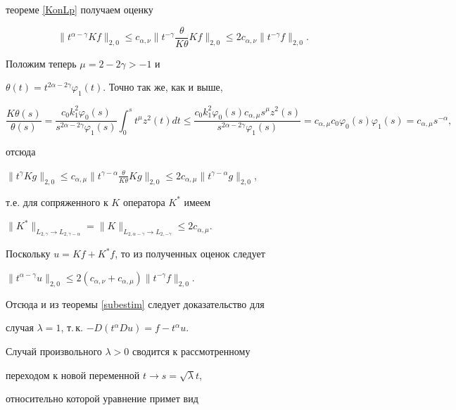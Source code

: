 \begin{pf}
теореме \ref{KonLp} получаем оценку


$$


\|t^{\alpha-\gamma}K f\|_{2,0} \le


c_{\alpha,\nu}\bigg\|t^{-\gamma}\frac{\theta}{K \theta}Kf\bigg\|_{2,0}


\le 2c_{\alpha,\nu} \|t^{-\gamma}f\|_{2,0}.


$$


Положим теперь $\mu=2-2\gamma>-1$ и


$\theta(t)=t^{2\alpha-2\gamma}\varphi_1(t)$. Точно так же, как и выше,


$$


\frac{K\theta(s)}{\theta(s)}= \frac{c_0 k_1^2


\varphi_0(s)}{s^{2\alpha-2\gamma}\varphi_1(s)}\int_0^s t^\mu


z^2(t) d t \le \frac{c_0 k_1^2 \varphi_0(s)c_{\alpha,\mu}s^\mu z^2(s)}


{s^{2\alpha-2\gamma}\varphi_1(s)}=c_{\alpha,\mu}c_0 \varphi_0(s)\varphi_1(s)


= c_{\alpha,\mu}s^{-\alpha},


$$


отсюда


$\|t^\gamma K g\|_{2,0} \le


c_{\alpha,\mu}\big\|t^{\gamma-\alpha}\frac{\theta}{K \theta}Kg\big\|_{2,0}


\le 2c_{\alpha,\mu} \|t^{\gamma-\alpha}g\|_{2,0}$,


т.е. для сопряженного к $K$ оператора $K^*$ имеем


$\|K^*\|_{L_{2,\gamma} \to L_{2,\gamma-\alpha}}


=\|K\|_{L_{2,\alpha-\gamma} \to L_{2,-\gamma}} \le


2c_{\alpha,\mu}$.


Поскольку $u=Kf+K^*f$, то из полученных оценок следует


$\|t^{\alpha-\gamma}u\|_{2,0}\le


2(c_{\alpha,\nu}+c_{\alpha,\mu})\|t^{-\gamma}f\|_{2,0}$.


Отсюда и из теоремы \ref{subestim} следует доказательство для


случая $\lambda=1$, т.\,к. $-D(t^\alpha D u)=f-t^\alpha u$.


Случай произвольного $\lambda > 0$ сводится к рассмотренному


переходом к новой переменной $t \to s=\sqrt{\lambda}t$,


относительно которой уравнение примет вид



\end{pf}
